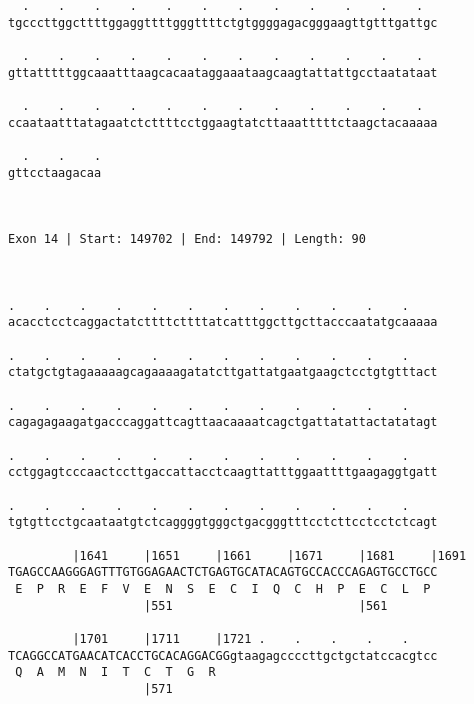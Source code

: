 \documentclass{article}
\begin{document}
\begin{Verbatim}
  .    .    .    .    .    .    .    .    .    .    .    .  
tgcccttggcttttggaggttttgggttttctgtggggagacgggaagttgtttgattgc
                                                            
  .    .    .    .    .    .    .    .    .    .    .    .  
gttatttttggcaaatttaagcacaataggaaataagcaagtattattgcctaatataat
                                                            
  .    .    .    .    .    .    .    .    .    .    .    .  
ccaataatttatagaatctcttttcctggaagtatcttaaatttttctaagctacaaaaa
                                                            
  .    .    .
gttcctaagacaa
             
             
 
Exon 14 | Start: 149702 | End: 149792 | Length: 90



.    .    .    .    .    .    .    .    .    .    .    .    
acacctcctcaggactatcttttcttttatcatttggcttgcttacccaatatgcaaaaa
                                                            
.    .    .    .    .    .    .    .    .    .    .    .    
ctatgctgtagaaaaagcagaaaagatatcttgattatgaatgaagctcctgtgtttact
                                                            
.    .    .    .    .    .    .    .    .    .    .    .    
cagagagaagatgacccaggattcagttaacaaaatcagctgattatattactatatagt
                                                            
.    .    .    .    .    .    .    .    .    .    .    .    
cctggagtcccaactccttgaccattacctcaagttatttggaattttgaagaggtgatt
                                                            
.    .    .    .    .    .    .    .    .    .    .    .    
tgtgttcctgcaataatgtctcaggggtgggctgacgggtttcctcttcctcctctcagt
                                                            
         |1641     |1651     |1661     |1671     |1681     |1691
TGAGCCAAGGGAGTTTGTGGAGAACTCTGAGTGCATACAGTGCCACCCAGAGTGCCTGCC
 E  P  R  E  F  V  E  N  S  E  C  I  Q  C  H  P  E  C  L  P 
                   |551                          |561       
  
         |1701     |1711     |1721 .    .    .    .    .    
TCAGGCCATGAACATCACCTGCACAGGACGGgtaagagccccttgctgctatccacgtcc
 Q  A  M  N  I  T  C  T  G  R                               
                   |571                                     
  

\end{Verbatim}
\end{document}
